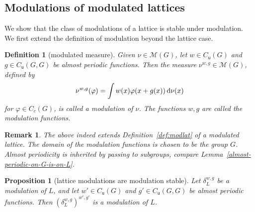 \documentclass[11pt, a4wide]{amsart}
\newtheorem{proposition}[lemma]{Proposition}
\newtheorem{definition}[lemma]{Definition}
\newtheorem{remark}[lemma]{Remark}
\numberwithin{lemma}{section}
\begin{document}
%


\subsection{Modulations of modulated lattices}

We show that the class of modulations of a lattice is stable under modulation. We first extend the definition of modulation beyond the lattice case.

\begin{definition}[modulated measure]\label{def:modps} Given $\nu\in \mathcal{M}(G)$, let $w\in C_\mathsf{u}(G)$ and $g\in C_\mathsf{u}(G, G)$ be almost periodic functions. Then the measure $\nu^{w,g}\in\mathcal{M}(G)$, defined by
%
\begin{displaymath}
\nu^{w,g}(\varphi)=\int w(x) \varphi(x+g(x))\, {\rm d}\nu(x)
\end{displaymath}
%
for $\varphi\in C_c(G)$, is called a \emph{modulation} of $\nu$. The functions $w, g$ are called the \emph{modulation functions}.
\end{definition}


\begin{remark}
The above indeed extends Definition~\ref{def:modlat} of a modulated lattice. The domain of the modulation functions is chosen to be the group $G$. Almost periodicity is inherited by passing to subgroups, compare Lemma~\ref{almost-periodic-on-G-is-on-L}.
\end{remark}


\begin{proposition}[lattice modulations are modulation stable]\label{prop:mlms}
Let $\delta_L^{w,g}$ be a modulation of $L$, and let $w'\in C_\mathsf{u}(G)$  and $g'\in C_\mathsf{u}(G,G)$ be almost periodic functions. Then $(\delta_L^{w,g})^{w', g'}$ is a modulation of $L$.
\end{proposition}
\end{document}
